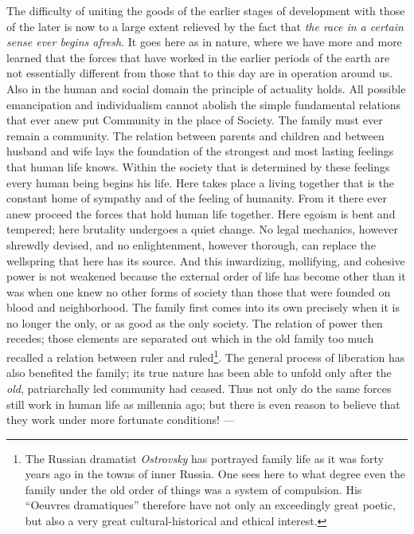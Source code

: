 \documentclass[12pt,a4paper,openany]{book}
\newcommand{\opage}[1]{\marginnote{\footnotesize\textit{[#1]}}}
\begin{document}
\opage{153}The difficulty of uniting the goods of the earlier stages of development
with those of the later is now to a large extent relieved by the fact that
\emph{the race in a certain sense ever begins afresh}. It goes
here as in nature, where we have more and more learned that the
forces that have worked in the earlier periods of the earth are not
essentially different from those that to this day are in
operation around us. Also in the human and social
domain the principle of actuality holds. All possible emancipation
and individualism cannot abolish the simple fundamental relations
that ever anew put Community in the place of Society.
The family must ever remain a community.
The relation between parents and children and between husband and wife
lays the foundation of the strongest and most lasting feelings that
human life knows. Within the society that is determined
by these feelings every human being begins his life. Here
takes place a living together that is the constant home of sympathy and of
the feeling of humanity. From it there ever anew proceed
the forces that hold human life together. Here egoism is bent and
tempered; here brutality undergoes a quiet
change. No legal mechanics, however shrewdly devised, and
no enlightenment, however thorough, can replace the
\opage{154}wellspring that here has its source. And this inwardizing,
mollifying, and cohesive power is not weakened because
the external order of life has become other than it was when one
knew no other forms of society than those that were founded
on blood and neighborhood. The family first comes into its
own precisely when it is no longer the only, or as good
as the only society. The relation of power then recedes;
those elements are separated out which in the old family too much
recalled a relation between ruler and ruled\footnote{The Russian dramatist \emph{Ostrovsky} has portrayed family life
as it was forty years ago in the towns of inner Russia.
One sees here to what degree even the family under the old
order of things was a system of compulsion. His ``Oeuvres dramatiques''
therefore have not only an exceedingly great poetic, but also a
very great cultural-historical and ethical interest.}.
The general process of liberation has also benefited the family;
its true nature has been able to unfold only
after the \emph{old}, patriarchally led community had
ceased. Thus not only do the same forces still work in human
life as millennia ago; but there is
even reason to believe that they work under more fortunate
conditions! ---
\end{document}

